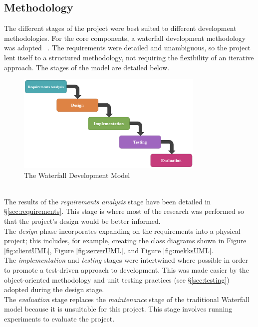 \subsection{Methodology}
\setlength{\leftskip}{0.5cm}
\indent \indent
The different stages of the project were best suited to different development methodologies. For the core components, a waterfall development methodology was adopted ~\cite{Waterfall}. The requirements were detailed and unambiguous, so the project lent itself to a structured methodology, not requiring the flexibility of an iterative approach. The stages of the model are detailed below.
\begin{figure}[ht]
    \centering
    \includegraphics[width=0.8\textwidth]{figures/waterfall.png}
    \caption{The Waterfall Development Model}
    \label{fig:waterfall}
\end{figure}
\\ \indent
The results of the \textit{requirements analysis} stage have been detailed in §\ref{sec:requirements}. This stage is where most of the research was performed so that the project's design would be better informed.
\smallskip \\ \indent
The \textit{design} phase incorporates expanding on the requirements into a physical project; this includes, for example, creating the class diagrams shown in Figure \ref{fig:clientUML}, Figure \ref{fig:serverUML}, and Figure \ref{fig:mekksUML}.
\smallskip \\ \indent
The \textit{implementation} and \textit{testing} stages were intertwined where possible in order to promote a test-driven approach to development. This was made easier by the object-oriented methodology and unit testing practices (see §\ref{sec:testing}) adopted during the design stage.
\smallskip \\ \indent
The \textit{evaluation} stage replaces the \textit{maintenance} stage of the traditional Waterfall model because it is unsuitable for this project. This stage involves running experiments to evaluate the project.
